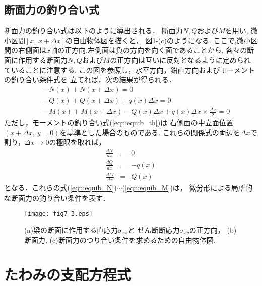 \documentclass[10pt,a4j]{jbook}
\begin{document}
\subsection{断面力の釣り合い式}
断面力の釣り合い式は以下のように導出される．
断面力$N,Q$および$M$を用い, 微小区間$[x,\,x+\Delta x]$の自由物体図を描くと，
図\ref{fig:fig7_3}-(c)のようになる.
ここで,微小区間の右側面は$x$軸の正方向,左側面は負の方向を向く面であることから,
各々の断面に作用する断面力$N,Q$および$M$の正方向は互いに反対となるように定められ
ていることに注意する.
この図を参照し，水平方向，鉛直方向およびモーメントの釣り合い条件式を
立てれば，次の結果が得られる．
\begin{eqnarray}
	&&-N(x)+N(x+\Delta x) =0 \label{eqn:equib_x} \\
	&&-Q(x)+Q(x+\Delta x)+q(x)\Delta x =0 \label{eqn:equib_y} \\
	&&-M(x)+M(x+\Delta x)-Q(x)\Delta x +q(x)\Delta x \times \frac{\Delta x}{2}=0 \label{eqn:equib_th}
\end{eqnarray}
ただし，モーメントの釣り合い式(\ref{eqn:equib_th})は
右側面の中立面位置$(x+\Delta x,\, y=0)$を基準とした場合のものである.
これらの関係式の両辺を$\Delta x$で割り，$\Delta x \rightarrow 0$の極限を取れば，
\begin{eqnarray}
	\frac{dN}{dx}&=&0  \label{eqn:equib_N} \\
	\frac{dQ}{dx}&=&-q(x) \label{eqn:equib_Q} \\
	\frac{dM}{dx}&=&Q(x) \label{eqn:equib_M}
\end{eqnarray}
となる．これらの式(\ref{eqn:equib_N})$\sim$(\ref{eqn:equib_M})は，
微分形による局所的な断面力の釣り合い条件を表す．
\begin{figure}
	\begin{center}
	\texttt{[image: fig7\_3.eps]} 
	\end{center}
	\caption{
	(a)梁の断面に作用する直応力$\sigma_{xx}$と
	せん断断応力$\sigma_{xy}$の正方向，
	(b)断面力, 
	(c)断面力のつり合い条件を求めるための自由物体図. 
	 } 
	\label{fig:fig7_3}
\end{figure}
\section{たわみの支配方程式}
\end{document}
